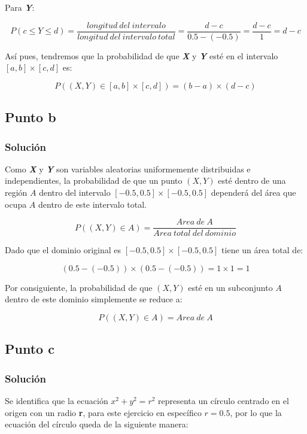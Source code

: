 \documentclass[12pt]{article}
\begin{document}
Para \textit{\textbf{Y}}:

\[P(c \leq Y \leq d) = \frac{longitud\ del\ intervalo}{longitud\ del\ intervalo\  total} = \frac{d-c}{0.5-(-0.5)} = \frac{d-c}{1} = d-c\]


Así pues, tendremos que la probabilidad de que \textit{\textbf{X}} y \textit{\textbf{Y}} esté en el intervalo $[a,b] \times [c,d]$ es:

\[P((X,Y) \in [a,b] \times [c,d]) = (b-a) \times (d-c)\]



\subsection{Punto b}


\subsubsection{Solución}

Como \textit{\textbf{X}} y \textit{\textbf{Y}} son variables aleatorias uniformemente distribuidas e independientes, la probabilidad de que un punto \textit{$(X,Y)$} esté dentro de una región \textbf{$A$} dentro del intervalo $[-0.5,0.5] \times [-0.5,0.5]$ dependerá del área que ocupa \textbf{$A$} dentro de este intervalo total.

\[P((X,Y) \in A) = \frac{Area\ de\ A}{Area\ total\ del\ dominio}\]

Dado que el dominio original es $[-0.5, 0.5] \times [-0.5,0.5]$ tiene un área total de:

\[(0.5-(-0.5)) \times (0.5-(-0.5))=1\times1=1\]

Por consiguiente, la probabilidad de que \textit{$(X,Y)$} esté en un subconjunto \textbf{$A$} dentro de este dominio simplemente se reduce a:

\[P((X,Y) \in A) = Area\ de\ A\]


\subsection{Punto c}
\subsubsection{Solución}

Se identifica que la ecuación $x^2+y^2=r^2$ representa un círculo centrado en el origen con un radio \textbf{r}, para este ejercicio en específico $r=0.5$, por lo que la ecuación del círculo queda de la siguiente manera:
\end{document}
